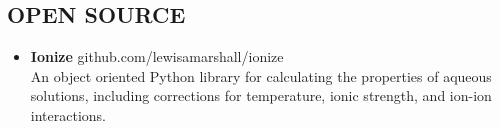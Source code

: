 \documentclass{res}
\begin{document}
\begin{resume}
 \section{OPEN SOURCE}
   \begin{itemize}
     \item \textbf{Ionize} github.com/lewisamarshall/ionize\\
   An object oriented Python library for calculating the properties of
   aqueous solutions, including corrections for temperature, ionic strength, and ion-ion interactions.
 \end{itemize}






\end{resume}
\end{document}

